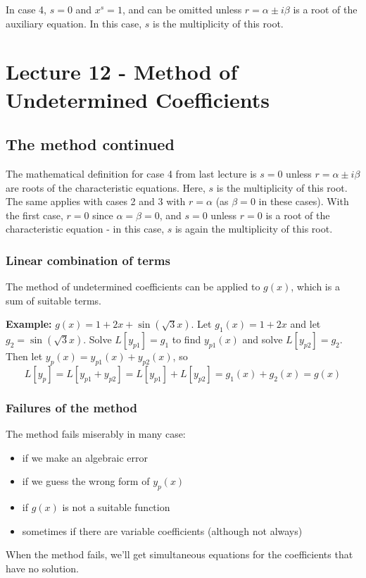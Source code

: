 \documentclass[11pt]{article}
\newcommand{\example}{\textbf{Example: }}
\begin{document}
	In case 4, $s = 0$ and $x^s = 1$, and can be omitted unless $r = \alpha \pm i \beta$ is a root of the auxiliary equation. In this case, $s$ is the multiplicity of this root.

\section{Lecture 12 - Method of Undetermined Coefficients}
\subsection{The method continued}
	The mathematical definition for case 4 from last lecture is $s=0$ unless $r = \alpha \pm i \beta$ are roots of the characteristic equations. Here, $s$ is the multiplicity of this root. The same applies with cases 2 and 3 with $r = \alpha$ (as $\beta = 0$ in these cases). With the first case, $r=0$ since $\alpha = \beta = 0$, and $s=0$ unless $r=0$ is a root of the characteristic equation - in this case, $s$ is again the multiplicity of this root.

\subsubsection{Linear combination of terms}
	The method of undetermined coefficients can be applied to $g(x)$, which is a sum of suitable terms.

	\example $g(x) = 1 + 2x + \sin(\sqrt{3}x)$. Let $g_1(x) = 1 + 2x$ and let $g_2 = \sin(\sqrt{3}x)$. Solve $L[y_{p1}] = g_1$ to find $y_{p1}(x)$ and solve $L[y_{p2}] = g_2$. Then let $y_p(x) = y_{p1}(x) + y_{p2}(x)$, so
		$$ L[y_p] = L[y_{p1} + y_{p2}] = L[y_{p1}] + L[y_{p2}] = g_1(x) + g_2(x) = g(x) $$

\subsubsection{Failures of the method}
	The method fails miserably in many case:
		\begin{itemize}
			\item if we make an algebraic error
			\item if we guess the wrong form of $y_p(x)$
			\item if $g(x)$ is not a suitable function
			\item sometimes if there are variable coefficients (although not always)
		\end{itemize}
	When the method fails, we'll get simultaneous equations for the coefficients that have no solution.
\end{document}
